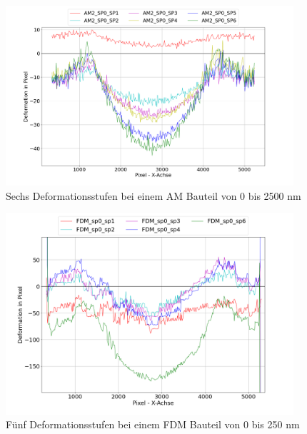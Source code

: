 \begin{figure}[H]
  \centering
  \includegraphics[width=0.95\textwidth]{images/am2_all_defos.png}
  \caption{Sechs Deformationsstufen bei einem AM Bauteil von 0 bis 2500 nm}
  \label{fig:am_defos}
\end{figure}

\begin{figure}[H]
  \centering
  \includegraphics[width=0.95\textwidth]{images/fdm2_all_defos.png}
  \caption{Fünf Deformationsstufen bei einem FDM Bauteil von 0 bis 250 nm}
  \label{fig:fdm_defos}
\end{figure}

